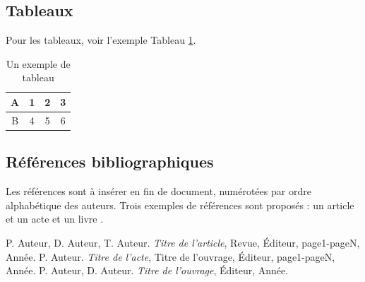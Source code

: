 \documentclass{CSMA2017}
\begin{document}
\subsection{Tableaux}

Pour les tableaux, voir l'exemple Tableau \ref{Tab:tab1}.

\begin{table}[htdp]
\caption{Un exemple de tableau}
\begin{center}
\begin{tabular}{|c|c|c|c|}
\hline
A&1&2&3\\
\hline
B&4&5&6\\
\hline
\end{tabular}
\end{center}
\label{Tab:tab1}
\end{table}%

\subsection{Références bibliographiques}

Les références sont à insérer en fin de document, numérotées par ordre alphabétique des auteurs. Trois exemples de références sont proposés : un article \cite{article} et un acte \cite{acte} et un livre  \cite{livre}.


\begin{thebibliography}{1}
P. Auteur, D. Auteur, T. Auteur. \emph{Titre de l'article}, Revue, Éditeur, page1-pageN, Année. 
 P. Auteur. \emph{Titre de l'acte}, Titre de l'ouvrage, Éditeur, page1-pageN, Année.
 P. Auteur, D. Auteur. \emph{Titre de l'ouvrage}, Éditeur, Année. 

\end{thebibliography}

\end{document}
